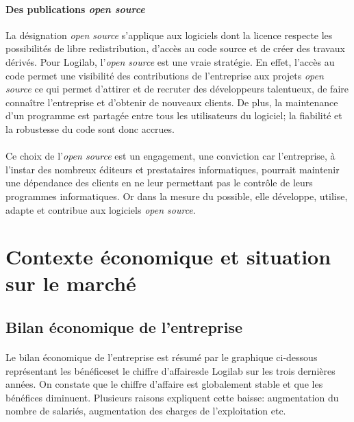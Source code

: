 \documentclass {report}
\begin{document}
\paragraph{Des publications \textit{open source}}
La désignation \textit{open source} s'applique aux logiciels dont la licence respecte les possibilités de libre redistribution, d'accès au code source et de créer des travaux dérivés. Pour Logilab, l'\textit{open source} est une vraie stratégie. En effet, l'accès au code permet une visibilité des contributions de l'entreprise aux projets \textit{open source} ce qui permet d'attirer et de recruter des développeurs talentueux, de faire connaître l'entreprise et d'obtenir de nouveaux clients. De plus, la maintenance d'un programme est partagée entre tous les utilisateurs du logiciel; la fiabilité et la robustesse du code sont donc accrues.

\paragraph{}
Ce choix de l'\textit{open source} est un engagement, une conviction car l'entreprise, à l'instar des nombreux éditeurs et prestataires informatiques, pourrait maintenir une dépendance des clients en ne leur permettant pas le contrôle de leurs programmes informatiques. Or dans la mesure du possible, elle développe, utilise, adapte et contribue aux logiciels \textit{open source}.





\section{Contexte économique et situation sur le marché}
\subsection{Bilan économique de l'entreprise}

\paragraph{}Le bilan économique de l'entreprise est résumé par le graphique ci-dessous représentant les bénéfices\footnotemark[1] et le chiffre d'affaires\footnotemark[2] de Logilab sur les trois dernières années. On constate que le chiffre d'affaire est globalement stable et que les bénéfices diminuent. Plusieurs raisons expliquent cette baisse: augmentation du nombre de salariés, augmentation des charges de l'exploitation etc.
\end{document}
